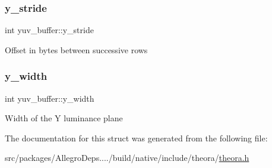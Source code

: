 \subsubsection{\texorpdfstring{y\+\_\+stride}{y\_stride}}
{\footnotesize\ttfamily int yuv\+\_\+buffer\+::y\+\_\+stride}

Offset in bytes between successive rows \mbox{\label{structyuv__buffer_aaa6c06c071da933231647238418d5fc0}} 
\subsubsection{\texorpdfstring{y\+\_\+width}{y\_width}}
{\footnotesize\ttfamily int yuv\+\_\+buffer\+::y\+\_\+width}

Width of the Y\textquotesingle{} luminance plane 

The documentation for this struct was generated from the following file\+:\begin{DoxyCompactItemize}
\item 
src/packages/\+Allegro\+Deps..../build/native/include/theora/\hyperlink{theora_8h}{theora.\+h}\end{DoxyCompactItemize}
